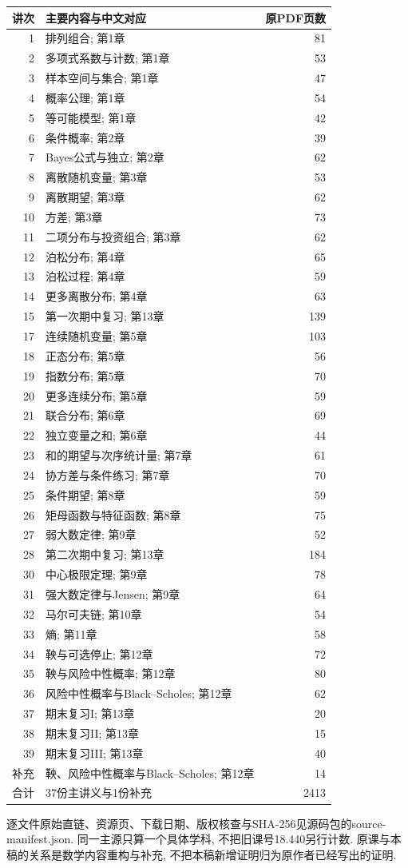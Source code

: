 \begin{longtable}{r p{8.0cm} r}
\toprule
讲次 & 主要内容与中文对应 & 原PDF页数\\
\midrule
\endhead
1 & 排列组合; 第1章 & 81\\
2 & 多项式系数与计数; 第1章 & 53\\
3 & 样本空间与集合; 第1章 & 47\\
4 & 概率公理; 第1章 & 54\\
5 & 等可能模型; 第1章 & 42\\
6 & 条件概率; 第2章 & 39\\
7 & Bayes公式与独立; 第2章 & 62\\
8 & 离散随机变量; 第3章 & 53\\
9 & 离散期望; 第3章 & 62\\
10 & 方差; 第3章 & 73\\
11 & 二项分布与投资组合; 第3章 & 62\\
12 & 泊松分布; 第4章 & 65\\
13 & 泊松过程; 第4章 & 59\\
14 & 更多离散分布; 第4章 & 63\\
15 & 第一次期中复习; 第13章 & 139\\
17 & 连续随机变量; 第5章 & 103\\
18 & 正态分布; 第5章 & 56\\
19 & 指数分布; 第5章 & 70\\
20 & 更多连续分布; 第5章 & 59\\
21 & 联合分布; 第6章 & 69\\
22 & 独立变量之和; 第6章 & 44\\
23 & 和的期望与次序统计量; 第7章 & 61\\
24 & 协方差与条件练习; 第7章 & 70\\
25 & 条件期望; 第8章 & 59\\
26 & 矩母函数与特征函数; 第8章 & 75\\
27 & 弱大数定律; 第9章 & 52\\
28 & 第二次期中复习; 第13章 & 184\\
30 & 中心极限定理; 第9章 & 78\\
31 & 强大数定律与Jensen; 第9章 & 64\\
32 & 马尔可夫链; 第10章 & 54\\
33 & 熵; 第11章 & 58\\
34 & 鞅与可选停止; 第12章 & 72\\
35 & 鞅与风险中性概率; 第12章 & 80\\
36 & 风险中性概率与Black--Scholes; 第12章 & 62\\
37 & 期末复习I; 第13章 & 20\\
38 & 期末复习II; 第13章 & 15\\
39 & 期末复习III; 第13章 & 40\\
补充 & 鞅、风险中性概率与Black--Scholes; 第12章 & 14\\
\midrule
合计 & 37份主讲义与1份补充 & 2413\\
\bottomrule
\end{longtable}
逐文件原始直链、资源页、下载日期、版权核查与SHA-256见源码包的source-manifest.json. 同一主源只算一个具体学科, 不把旧课号18.440另行计数. 原课与本稿的关系是数学内容重构与补充, 不把本稿新增证明归为原作者已经写出的证明.
